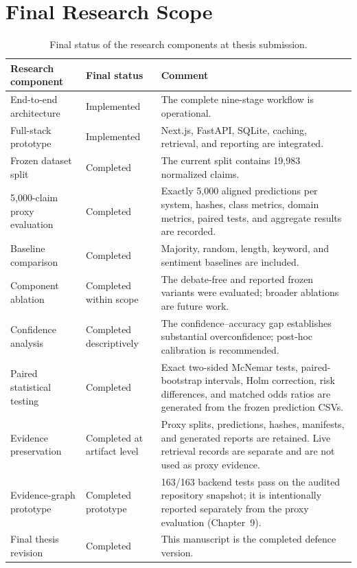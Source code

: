 \documentclass[12pt,a4paper,openany]{report}
\begin{document}
\section{Final Research Scope}
\begin{table}[H]
\centering
\caption{Final status of the research components at thesis submission.}
\label{tab:maturity}
\small
\begin{tabularx}{\textwidth}{p{4cm}p{2.6cm}X}
\toprule
Research component & Final status & Comment \\
\midrule
End-to-end architecture & Implemented & The complete nine-stage workflow is operational. \\
Full-stack prototype & Implemented & Next.js, FastAPI, SQLite, caching, retrieval, and reporting are integrated. \\
Frozen dataset split & Completed & The current split contains 19{,}983 normalized claims. \\
5{,}000-claim proxy evaluation & Completed & Exactly 5{,}000 aligned predictions per system, hashes, class metrics, domain metrics, paired tests, and aggregate results are recorded. \\
Baseline comparison & Completed & Majority, random, length, keyword, and sentiment baselines are included. \\
Component ablation & Completed within scope & The debate-free and reported frozen variants were evaluated; broader ablations are future work. \\
Confidence analysis & Completed descriptively & The confidence--accuracy gap establishes substantial overconfidence; post-hoc calibration is recommended. \\
Paired statistical testing & Completed & Exact two-sided McNemar tests, paired-bootstrap intervals, Holm correction, risk differences, and matched odds ratios are generated from the frozen prediction CSVs. \\
Evidence preservation & Completed at artifact level & Proxy splits, predictions, hashes, manifests, and generated reports are retained. Live retrieval records are separate and are not used as proxy evidence. \\
Evidence-graph prototype & Completed prototype & 163/163 backend tests pass on the audited repository snapshot; it is intentionally reported separately from the proxy evaluation (Chapter~9). \\
Final thesis revision & Completed & This manuscript is the completed defence version. \\
\bottomrule
\end{tabularx}
\end{table}
\end{document}
